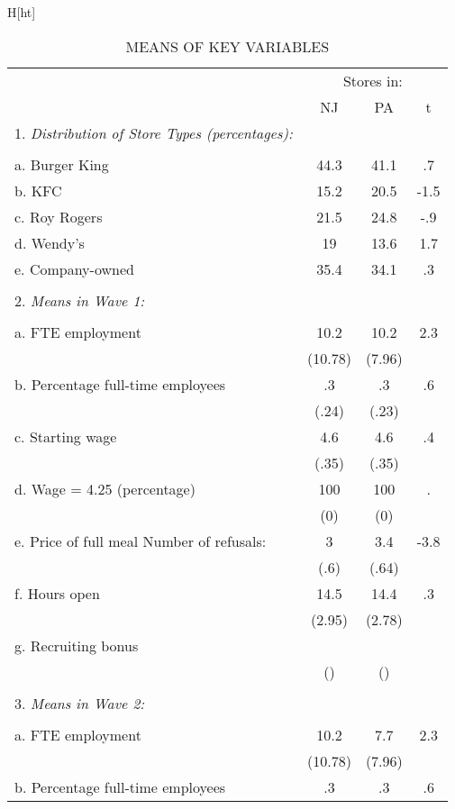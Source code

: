 \documentclass[11pt]{article}
\begin{document}
\begin{center}
			{
\begin{table}{H}[ht]
	\centering
	\caption{MEANS OF KEY VARIABLES}\label{t_main}
	\setlength{\tabcolsep}{2.5pt}
	\begin{tabular}{@{}lccc@{}}
		\toprule \toprule
		\multicolumn{3}{r}{Stores in:} & \\
		\cmidrule{2-4}
		& NJ & PA & t \\   \cmidrule{1-4}
		1. \emph{Distribution of Store Types (percentages):} \\
		\\
		a. Burger King & 44.3 & 41.1 & .7\\
		b. KFC & 15.2 & 20.5 & -1.5\\
		c. Roy Rogers & 21.5 & 24.8 & -.9\\
		d. Wendy's & 19 & 13.6 & 1.7\\
		e. Company-owned & 35.4 & 34.1 & .3\\
		\\
		2. \emph{Means in Wave 1:} \\
		\\
		a. FTE employment & 10.2 & 10.2 & 2.3\\
		& (10.78) & (7.96) &\\
		b. Percentage full-time employees & .3 & .3 & .6\\
		& (.24) & (.23) & \\
		c. Starting wage & 4.6 & 4.6 & .4\\
		& (.35) & (.35) & \\
		d. Wage = 4.25 (percentage) & 100 & 100 & .\\
		& (0) & (0) &\\
		e. Price of full meal Number of refusals: & 3 & 3.4 & -3.8\\
		& (.6) & (.64) & \\
		f. Hours open & 14.5 & 14.4 & .3\\
		& (2.95) & (2.78) & \\
		g. Recruiting bonus &  &  & \\
		& () & () & \\
		\\
		3. \emph{Means in Wave 2:} \\
		\\
		a. FTE employment & 10.2 & 7.7 & 2.3\\
		& (10.78) & (7.96) & \\
		b. Percentage full-time employees & .3 & .3 & .6\\

\end{tabular}
\end{table}}
\end{center}
\end{document}

